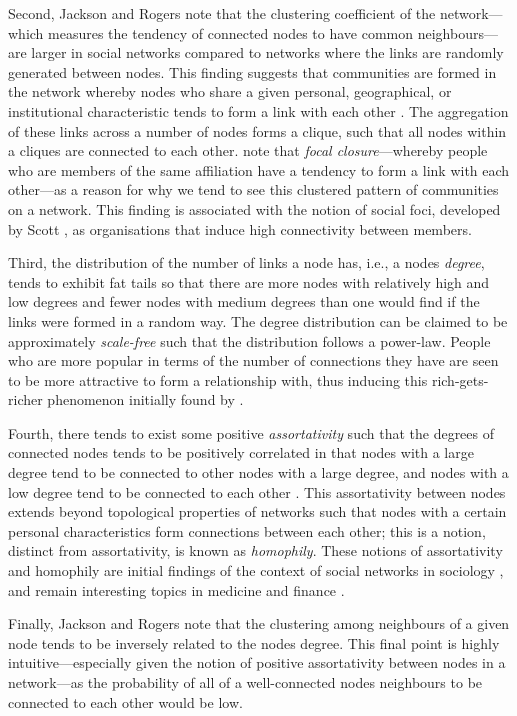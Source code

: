 Second, Jackson and Rogers note that the clustering coefficient of the network---which measures the tendency of connected nodes to have common neighbours---are larger in social networks compared to networks where the links are randomly generated between nodes. This finding suggests that communities are formed in the network whereby nodes who share a given personal, geographical, or institutional characteristic tends to form a link with each other \citep{Watts2002}. The aggregation of these links across a number of nodes forms a clique, such that all nodes within a cliques are connected to each other. \citet{KossinetsWatts2006} note that \emph{focal closure}---whereby people who are members of the same affiliation have a tendency to form a link with each other---as a reason for why we tend to see this clustered pattern of communities on a network. This finding is associated with the notion of social foci, developed by Scott \citet{Feld1981, Feld1982}, as organisations that induce high connectivity between members.

Third, the distribution of the number of links a node has, i.e., a nodes \emph{degree}, tends to exhibit fat tails so that there are more nodes with relatively high and low degrees and fewer nodes with medium degrees than one would find if the links were formed in a random way. The degree distribution can be claimed to be approximately \emph{scale-free} such that the distribution follows a power-law. People who are more popular in terms of the number of connections they have are seen to be more attractive to form a relationship with, thus inducing this rich-gets-richer phenomenon initially found by \citet{Simon1955}.

Fourth, there tends to exist some positive \emph{assortativity} such that the degrees of connected nodes tends to be positively correlated in that nodes with a large degree tend to be connected to other nodes with a large degree, and nodes with a low degree tend to be connected to each other \citep{Newman2003mixing}. This assortativity between nodes extends beyond topological properties of networks such that nodes with a certain personal characteristics form connections between each other; this is a notion, distinct from assortativity, is known as \emph{homophily}. These notions of assortativity and homophily are initial findings of the context of social networks in sociology \citep{McPherson2001}, and remain interesting topics in medicine and finance \citep{Haldane2009, HaldaneMay2011}.

Finally, Jackson and Rogers note that the clustering among neighbours of a given node tends to be inversely related to the nodes degree. This final point is highly intuitive---especially given the notion of positive assortativity between nodes in a network---as the probability of all of a well-connected nodes neighbours to be connected to each other would be low.

